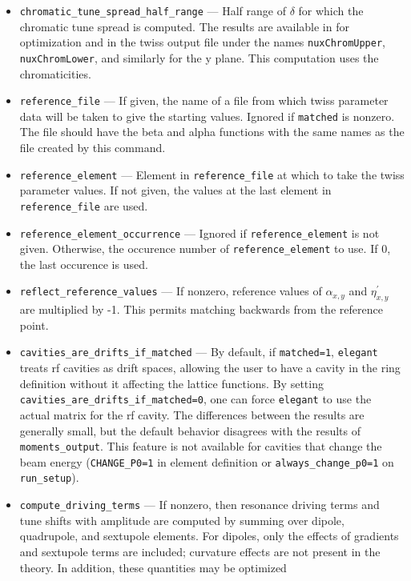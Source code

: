 \documentclass[11pt]{article}
\begin{document}
\begin{itemize}
\item \verb|chromatic_tune_spread_half_range| --- Half range of $\delta$ for which the
        chromatic tune spread is computed.  The results are available in for optimization  and
        in the twiss output file under the names \verb|nuxChromUpper|, \verb|nuxChromLower|, 
        and similarly for the y plane.  This computation uses the chromaticities.

\item \verb|reference_file| --- If given, the name of a file from which twiss parameter data will
        be taken to give the starting values.  Ignored if \verb|matched| is nonzero.  The file
        should have the beta and alpha functions with the same names as the file created by
        this command.
\item \verb|reference_element| --- Element in \verb|reference_file| at which to take the
        twiss parameter values.  If not given, the values at the last element in \verb|reference_file|
        are used.
\item \verb|reference_element_occurrence| --- Ignored if \verb|reference_element| is not given.
        Otherwise, the occurence number of \verb|reference_element| to use.  If 0, the last
        occurence is used.
\item \verb|reflect_reference_values| --- If nonzero, reference values of $\alpha_{x,y}$ and $\eta^\prime_{x,y}$ are
  multiplied by -1.  This permits matching backwards from the reference point.
\item \verb|cavities_are_drifts_if_matched| --- By default,  if \verb|matched=1|, {\tt elegant} treats rf cavities
  as drift spaces, allowing the user to have a cavity in the ring definition without it affecting the lattice functions.
  By setting \verb|cavities_are_drifts_if_matched=0|, one can force {\tt elegant} to use the actual matrix for the
  rf cavity.  The differences between the 
  results are generally small, but the default behavior disagrees with the results of \verb|moments_output|.
  This feature is not available for cavities that change the beam energy (\verb|CHANGE_P0=1| in element definition 
  or \verb|always_change_p0=1| on \verb|run_setup|).
\item \verb|compute_driving_terms| --- If nonzero, then resonance driving terms \cite{Bengtsson} and
 tune shifts with amplitude are computed by summing over dipole, quadrupole, and sextupole elements.  For dipoles, only the effects of gradients and
 sextupole terms are included; curvature effects are not present in the theory.   In addition, these quantities may be optimized 

\end{itemize}
\end{document}
